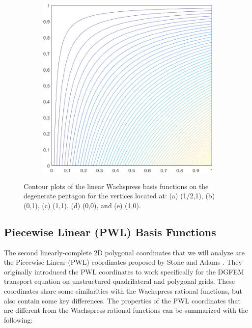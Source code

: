 \begin{figure}
\begin{subfigure}[b]{0.39\textwidth}
		\caption{}
	\end{subfigure}
	\hspace{1.5cm}
	\begin{subfigure}[b]{0.39\textwidth}
		\centering
		\includegraphics[width=\textwidth]{figures/sec_BF/deg_square_WACHSPRESS1_contour_b2.png}
		\caption{}
	\end{subfigure}
\caption{Contour plots of the linear Wachspress basis functions on the degenerate pentagon for the vertices located at: (a) (1/2,1), (b) (0,1), (c) (1,1), (d) (0,0), and (e) (1,0).}
\label{fig::2D_WACHSPRESS1_deg_square_basis_functions}
\end{figure}

\subsection{Piecewise Linear (PWL) Basis Functions}
\label{sec::BF_2DLinear_PWL}

The second linearly-complete 2D polygonal coordinates that we will analyze are the Piecewise Linear (PWL) coordinates proposed by Stone and Adams \cite{ref::PWLD_stone_adams,ref::PWLD_stone_adams_unstructured}. They originally introduced the PWL coordinates to work specifically for the DGFEM transport equation on unstructured quadrilateral and polygonal grids. These coordinates share some similarities with the Wachspress rational functions, but also contain some key differences. The properties of the PWL coordinates that are different from the Wachspress rational functions can be summarized with the following:

